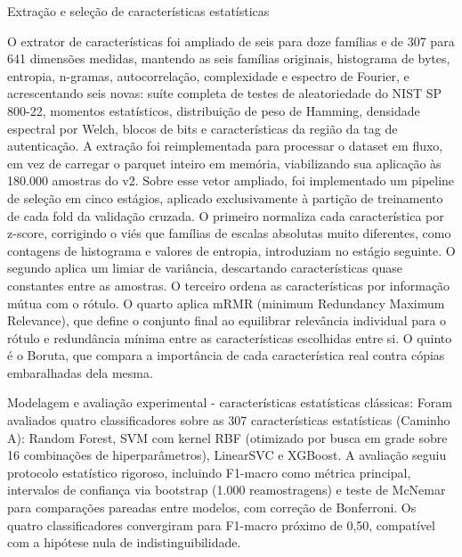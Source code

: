  
 
\begin{tarefac}Extração e seleção de características estatísticas

O extrator de características foi ampliado de seis para doze famílias e de 307 para 641 dimensões medidas, mantendo as seis famílias originais, histograma de bytes, entropia, n-gramas, autocorrelação, complexidade e espectro de Fourier, e acrescentando seis novas: suíte completa de testes de aleatoriedade do NIST SP 800-22, momentos estatísticos, distribuição de peso de Hamming, densidade espectral por Welch, blocos de bits e características da região da tag de autenticação. A extração foi reimplementada para processar o dataset em fluxo, em vez de carregar o parquet inteiro em memória, viabilizando sua aplicação às 180.000 amostras do v2. Sobre esse vetor ampliado, foi implementado um pipeline de seleção em cinco estágios, aplicado exclusivamente à partição de treinamento de cada fold da validação cruzada. O primeiro normaliza cada característica por z-score, corrigindo o viés que famílias de escalas absolutas muito diferentes, como contagens de histograma e valores de entropia, introduziam no estágio seguinte. O segundo aplica um limiar de variância, descartando características quase constantes entre as amostras. O terceiro ordena as características por informação mútua com o rótulo. O quarto aplica mRMR (minimum Redundancy Maximum Relevance), que define o conjunto final ao equilibrar relevância individual para o rótulo e redundância mínima entre as características escolhidas entre si. O quinto é o Boruta, que compara a importância de cada característica real contra cópias embaralhadas dela mesma.
\end{tarefac}
 
 
 
\begin{tarefac}
Modelagem e avaliação experimental - características estatísticas clássicas:
Foram avaliados quatro classificadores sobre as 307 características estatísticas (Caminho A): Random Forest, SVM com kernel RBF (otimizado por busca em grade sobre 16 combinações de hiperparâmetros), LinearSVC e XGBoost. A avaliação seguiu protocolo estatístico rigoroso, incluindo F1-macro como métrica principal, intervalos de confiança via bootstrap (1.000 reamostragens) e teste de McNemar para comparações pareadas entre modelos, com correção de Bonferroni. Os quatro classificadores convergiram para F1-macro próximo de 0,50, compatível com a hipótese nula de indistinguibilidade.
\end{tarefac}
 
